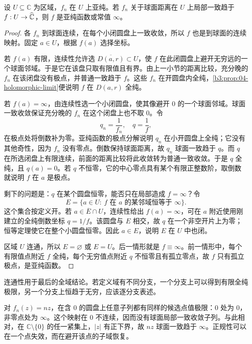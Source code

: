 \begin{proposition}\label{b3:prop:04-spherical-limit}
设 \(U\subseteq\mathbb C\) 为区域，\(f_n\) 在 \(U\) 上亚纯。若 \(f_n\) 关于球面距离在 \(U\) 上局部一致趋于 \(f:U\to\widehat{\mathbb C\kern0pt}\)，则 \(f\) 是亚纯函数或常值 \(\infty\)。
\end{proposition}
\begin{proof}
各 \(f_n\) 到球面连续，在每个小闭圆盘上一致收敛，所以 \(f\) 也是到球面的连续映射。固定 \(a\in U\)，根据 \(f(a)\) 选择坐标。

若 \(f(a)\) 有限，连续性允许选 \(\overline{D(a,r)}\subset U\)，使 \(f\) 在此闭圆盘上避开无穷远的一个球面邻域。于是它在该盘只取有限值且有界。由上一小节的距离比较，充分晚的 \(f_n\) 在该闭盘没有极点，并普通一致趋于 \(f\)。这些 \(f_n\) 在开圆盘内全纯，\cref{b3:prop:04-holomorphic-limit}便说明 \(f\) 在 \(D(a,r)\) 全纯。

若 \(f(a)=\infty\)，由连续性选一个小闭圆盘，使其像避开 \(0\) 的一个球面邻域。球面一致收敛保证充分晚的 \(f_n\) 在这个闭盘上也不取 \(0\)。令
\[
 q_n=\frac1{f_n},\quad q=\frac1f,
\]
在极点处将倒数补为零。亚纯函数的极点分解说明 \(q_n\) 在小开圆盘上全纯；它没有其他奇性，因为 \(f_n\) 没有零点。倒数保持球面距离，故 \(q_n\) 球面一致趋于 \(q\)。而 \(q\) 在所选闭盘上有限连续，前面的距离比较将此收敛转为普通一致收敛。于是 \(q\) 全纯，且 \(q(a)=0\)。若 \(q\) 不恒零，它的中心零点具有某个有限正整数阶，取倒数就说明 \(f\) 在 \(a\) 是极点。

剩下的问题是：\(q\) 在某个圆盘恒零，能否只在局部造成 \(f=\infty\)？令
\[
 E=\{a\in U:\ f\text{ 在 }a\text{ 的某邻域恒等于 }\infty\}.
\]
这个集合按定义开。若 \(a\in\overline E\cap U\)，连续性给出 \(f(a)=\infty\)，可在 \(a\) 附近使用刚建立的全纯倒数坐标 \(q=1/f\)。该圆盘与 \(E\) 相交，故 \(q\) 在一个非空开片上为零；恒等定理使它在整个小圆盘恒零。因此 \(a\in E\)，说明 \(E\) 在 \(U\) 中也闭。

区域 \(U\) 连通，所以 \(E=\varnothing\) 或 \(E=U\)。后一情形就是 \(f\equiv\infty\)。前一情形中，每个有限值点附近 \(f\) 全纯，每个无穷值点附近 \(q\) 不恒零且有孤立零点，故 \(f\) 只有孤立极点，是亚纯函数。
\end{proof}
连通性用于最后的全域结论。若定义域有不同分支，一个分支上可以得到有限全纯极限，另一个分支上恒趋于无穷，应该逐分支表述。

\ProseParagraphBreak

对 \(f_n(z)=nz\)，在含 \(0\) 的圆盘上任意子列都有同样的候选点值极限：\(0\) 处为 \(0\)，非零点处为 \(\infty\)。这个映射在 \(0\) 不连续，因而没有球面局部一致收敛子列。与此相对，在 \(\mathbb C\setminus\{0\}\) 的任一紧集上，\(|z|\) 有正下界，故 \(nz\) 球面一致趋于 \(\infty\)。正规性可以在一个点失效，而在避开该点的子域恢复。

